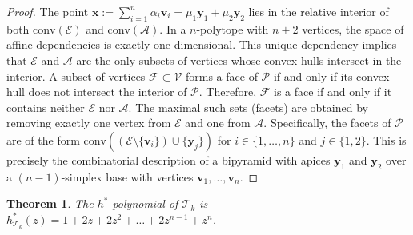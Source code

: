 \documentclass[a4paper,11pt,reqno]{amsart}
\newcommand{\Aa}{{\mathcal A}}
\newcommand{\Ff}{{\mathcal F}}
\newcommand{\Vv}{{\mathcal V}}
\newcommand{\Ee}{{\mathcal E}}
\newcommand{\Pp}{{\mathcal P}}
\newtheorem{theorem}{Theorem}[section]
\begin{document}
\begin{proof}
The point $\bm{x} := \sum_{i=1}^n \alpha_i \bm{v}_i = \mu_1 \bm{y}_1 + \mu_2 \bm{y}_2$ lies in the relative interior of both 
$\text{conv}(\Ee)$ and $\text{conv}(\Aa)$. In a $n$-polytope with $n+2$ vertices, the space of affine dependencies is exactly 
one-dimensional. This unique dependency implies that $\Ee$ and $\Aa$ are the only subsets of vertices whose convex hulls
intersect in the interior. A subset of vertices $\Ff \subset \Vv$ forms a face of $\Pp$ if and only if its convex hull does not 
intersect the interior of $\Pp$. Therefore, $\Ff$ is a face if and only if it contains neither $\Ee$ nor $\Aa$. The maximal such 
sets (facets) are obtained by removing exactly one vertex from $\Ee$ and one from $\Aa$. Specifically, the facets of $\Pp$ 
are of the form $\text{conv}((\Ee \setminus \{\bm{v}_i\}) \cup \{\bm{y}_j\})$ for $i \in \{1, \dots, n\}$ and $j \in \{1, 2\}$. 
This is precisely the combinatorial description of a bipyramid with apices $\bm{y}_1$ and $\bm{y}_2$ over a $(n-1)$-simplex 
base with vertices $\bm{v}_1, \dots, \bm{v}_n$.
\end{proof}
\begin{theorem}
The $h^*$-polynomial of $\mathcal{T}_k$ is $h_{\mathcal{T}_k}^*(z) = 1 + 2z + 2z^2 + \dots + 2z^{n-1} + z^n$.
\end{theorem}
\end{document}
